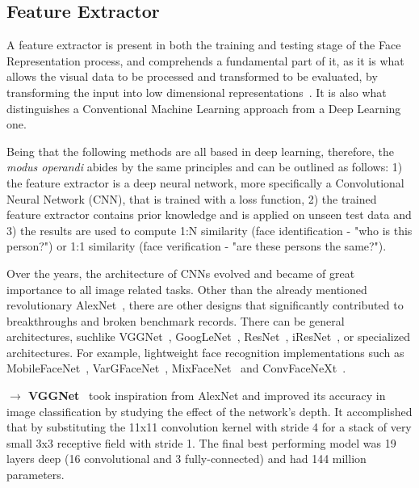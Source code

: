 \documentclass[class=report, crop=false, a4paper, 12pt]{standalone}
\begin{document}
\vspace{\baselineskip}
\subsection{Feature Extractor}
A feature extractor is present in both the training and testing stage of the Face Representation process, and comprehends a fundamental part of it, as it is what allows the visual data to be processed and transformed to be evaluated, by transforming the input into low dimensional representations~\autocite{lecunGradientBasedLearningApplied1998}. It is also what distinguishes a Conventional Machine Learning approach from a Deep Learning one.  
\par Being that the following methods are all based in deep learning, therefore, the \textit{modus operandi} abides by the same principles and can be outlined as follows: 1) the feature extractor is a deep neural network, more specifically a Convolutional Neural Network (CNN), that is trained with a loss function, 2) the trained feature extractor contains prior knowledge and is applied on unseen test data and 3) the results are used to compute 1:N similarity (face identification - "who is this person?") or 1:1 similarity (face verification - "are these persons the same?").
\par Over the years, the architecture of CNNs evolved and became of great importance to all image related tasks. Other than the already mentioned revolutionary AlexNet~\autocite{krizhevskyImageNetClassificationDeep2012}, there are other designs that significantly contributed to breakthroughs and broken benchmark records. There can be general architectures, suchlike VGGNet~\autocite{simonyanVERYDEEPCONVOLUTIONAL2015}, GoogLeNet~\autocite{szegedyGoingDeeperConvolutions2014}, ResNet~\autocite{heDeepResidualLearning2016}, iResNet~\autocite{dutaImprovedResidualNetworks2021}, or specialized architectures. For example, lightweight face recognition implementations such as MobileFaceNet~\autocite{chenMobileFaceNetsEfficientCNNs2018}, VarGFaceNet~\autocite{yanVarGFaceNetEfficientVariable2019}, MixFaceNet~\autocite{boutrosMixFaceNetsExtremelyEfficient2021} and ConvFaceNeXt~\autocite{hooConvFaceNeXtLightweightNetworks2022}.

\newpage
\noindent\textbf{$\rightarrow$ VGGNet}~\autocite{simonyanVERYDEEPCONVOLUTIONAL2015} took inspiration from AlexNet and improved its accuracy in image classification by studying the effect of the network's depth. It accomplished that by substituting the 11x11 convolution kernel with stride 4 for a stack of very small 3x3 receptive field with stride 1. The final best performing model was 19 layers deep (16 convolutional and 3 fully-connected) and had 144 million parameters.
\end{document}
